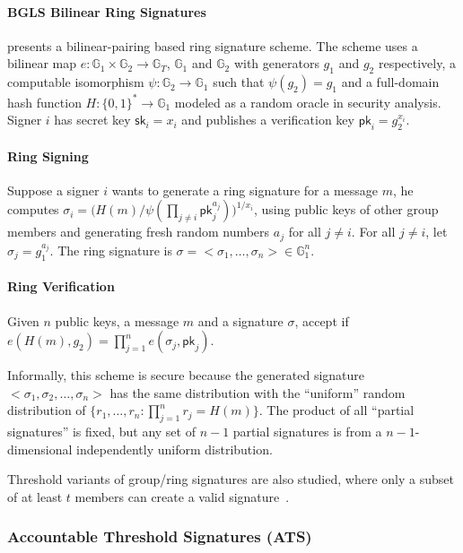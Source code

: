 \paragraph{BGLS Bilinear Ring Signatures} \cite{DBLP:conf/eurocrypt/BonehGLS03} presents a bilinear-pairing based ring signature scheme. The scheme uses a bilinear map $e:\mathbb{G}_1\times \mathbb{G}_2\to \mathbb{G}_T$, $\mathbb{G}_1$ and $\mathbb{G}_2$ with generators $g_1$ and $g_2$ respectively, a computable isomorphism $\psi: \mathbb{G}_2 \to \mathbb{G}_1$ such that $\psi(g_2) = g_1$ and a full-domain hash function $H:\{0,1\}^\ast \to \mathbb{G}_1$ modeled as a random oracle in security analysis. Signer $i$ has secret key $\mathsf{sk}_i =  x_i$ and publishes a verification key $\mathsf{pk}_i=g_2^{x_i}$. 

\paragraph{Ring Signing} Suppose a signer $i$ wants to generate a ring signature for a message $m$, he computes $\sigma_i = \big( H(m)/\psi(\prod_{j\neq i} \mathsf{pk}_j^{a_j} ) \big)^{1/{x_i}}$, using public keys of other group members and generating fresh random numbers $a_j$ for all $j\neq i$. For all $j\neq i$, let $\sigma_j=g_1^{a_j}$. The ring signature is $\sigma = <\sigma_1, \dots, \sigma_n>\in \mathbb{G}_1^n$. 

\paragraph{Ring Verification} Given $n$ public keys, a message $m$ and a signature $\sigma$, accept if $e(H(m), g_2) = \prod_{j=1}^n e(\sigma_j, \mathsf{pk}_j)$. 

Informally, this scheme is secure because the generated signature $<\sigma_1, \sigma_2, \dots, \sigma_n>$ has the same distribution with the ``uniform'' random distribution of $\{r_1, \dots, r_n: \prod_{j=1}^n r_j = H(m)\}$. The product of all ``partial signatures'' is fixed, but any set of $n-1$ partial signatures is from a $n-1$-dimensional independently uniform distribution. 

Threshold variants of group/ring signatures are also studied, where only a subset of at least $t$ members can create a valid signature~\cite{DBLP:conf/crypto/BressonSS02}. 


\subsubsection{Accountable Threshold Signatures (ATS)}
